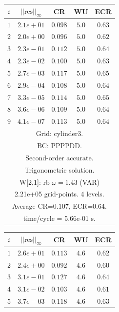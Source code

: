 \begin{table}[hbt]
\begin{center}
\begin{tabular}{|c|c|c|c|c|} \hline 
 $i$   & $\vert\vert\mbox{res}\vert\vert_\infty$  &  CR     &  WU    & ECR  \\   \hline 
 $ 1$  & $ 2.1e+01$ & $0.098$ & $ 5.0$ & $0.63$ \\ 
 $ 2$  & $ 2.0e+00$ & $0.096$ & $ 5.0$ & $0.62$ \\ 
 $ 3$  & $ 2.3e-01$ & $0.112$ & $ 5.0$ & $0.64$ \\ 
 $ 4$  & $ 2.3e-02$ & $0.100$ & $ 5.0$ & $0.63$ \\ 
 $ 5$  & $ 2.7e-03$ & $0.117$ & $ 5.0$ & $0.65$ \\ 
 $ 6$  & $ 2.9e-04$ & $0.108$ & $ 5.0$ & $0.64$ \\ 
 $ 7$  & $ 3.3e-05$ & $0.114$ & $ 5.0$ & $0.65$ \\ 
 $ 8$  & $ 3.6e-06$ & $0.109$ & $ 5.0$ & $0.64$ \\ 
 $ 9$  & $ 4.1e-07$ & $0.113$ & $ 5.0$ & $0.64$ \\ 
\hline 
\multicolumn{5}{|c|}{Grid: cylinder3.}  \\
\multicolumn{5}{|c|}{BC: PPPPDD.}  \\
\multicolumn{5}{|c|}{Second-order accurate.}  \\
\multicolumn{5}{|c|}{Trigonometric solution.}  \\
\multicolumn{5}{|c|}{W[2,1]: rb $\omega=1.43$ (VAR)}  \\
\multicolumn{5}{|c|}{2.21e+05 grid-points. 4 levels.}  \\
\multicolumn{5}{|c|}{Average CR=$0.107$, ECR=$0.64$.}  \\
\multicolumn{5}{|c|}{time/cycle = 5.66e-01 s.}  \\
\hline 
\end{tabular}
\qquad
\begin{tabular}{|c|c|c|c|c|} \hline 
 $i$   & $\vert\vert\mbox{res}\vert\vert_\infty$  &  CR     &  WU    & ECR  \\   \hline 
 $ 1$  & $ 2.6e+01$ & $0.113$ & $ 4.6$ & $0.62$ \\ 
 $ 2$  & $ 2.4e+00$ & $0.092$ & $ 4.6$ & $0.60$ \\ 
 $ 3$  & $ 3.1e-01$ & $0.127$ & $ 4.6$ & $0.64$ \\ 
 $ 4$  & $ 3.1e-02$ & $0.103$ & $ 4.6$ & $0.61$ \\ 
 $ 5$  & $ 3.7e-03$ & $0.118$ & $ 4.6$ & $0.63$ \\ 

\end{tabular}
\end{center}
\end{table}
